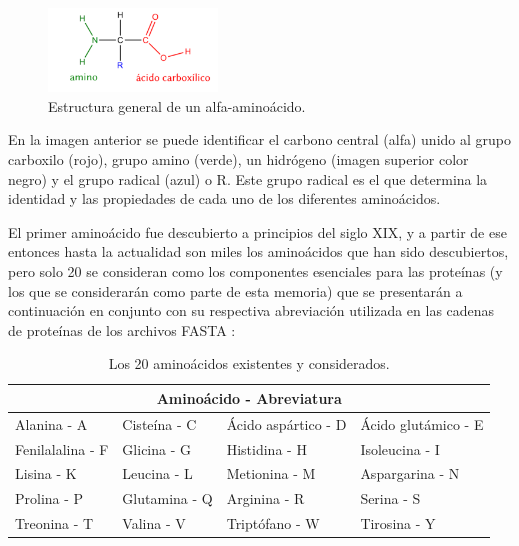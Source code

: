 \begin{figure}[h]
    \centering
    \includegraphics[width=0.4\textwidth]{./images/aminoacido}
    \caption{Estructura general de un alfa-aminoácido.}
    \label{fig:image3}
\end{figure}

En la imagen anterior se puede identificar el carbono central (alfa) unido al grupo carboxilo (rojo), grupo amino (verde), un hidrógeno (imagen superior color negro) y el grupo radical (azul) o R. Este grupo radical es el que determina la identidad y las propiedades de cada uno de los diferentes aminoácidos.

El primer aminoácido fue descubierto a principios del siglo XIX, y a partir de ese entonces hasta la actualidad son miles los aminoácidos que han sido descubiertos, pero solo 20 se consideran como los componentes esenciales para las proteínas (y los que se considerarán como parte de esta memoria) que se presentarán a continuación en conjunto con su respectiva abreviación utilizada en las cadenas de proteínas de los archivos FASTA \cite{fasta}:

\begin{table}[H]
\centering
\label{my-label5}
\begin{tabular}{|l l l l|}
\hline
\multicolumn{4}{|c|}{Aminoácido - Abreviatura}\\ \hline
Alanina - A      & Cisteína - C       &      Ácido aspártico - D     & Ácido glutámico - E                     \\
Fenilalalina - F      &  Glicina - G           & Histidina - H     & Isoleucina - I                \\
Lisina - K      & Leucina - L            & Metionina - M           & Aspargarina - N          \\
Prolina - P      & Glutamina - Q          & Arginina - R                  & Serina - S                  \\
Treonina - T      & Valina - V          & Triptófano - W                      & Tirosina - Y   \\ \hline
\end{tabular}
\caption{Los 20 aminoácidos existentes y considerados.}
\end{table}

